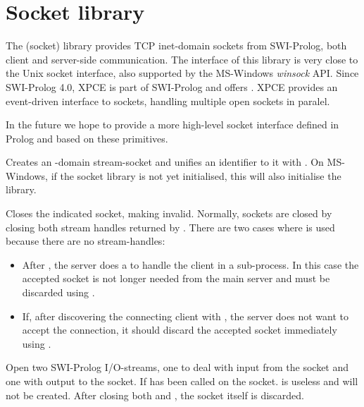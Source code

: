 \documentclass[11pt]{article}
\begin{document}
\section{Socket library}

The \pllib(socket) library provides TCP inet-domain sockets from
SWI-Prolog, both client and server-side communication. The interface of
this library is very close to the Unix socket interface, also supported
by the MS-Windows {\em winsock} API.  Since SWI-Prolog 4.0, XPCE is part
of SWI-Prolog and offers .  XPCE provides an event-driven
interface to sockets, handling multiple open sockets in paralel.

In the future we hope to provide a more high-level socket interface
defined in Prolog and based on these primitives.

\begin{description}
Creates an -domain stream-socket and unifies an identifier
to it with . On MS-Windows, if the socket library is not
yet initialised, this will also initialise the library.

Closes the indicated socket, making  invalid.  Normally,
sockets are closed by closing both stream handles returned by
.  There are two cases where  is used
because there are no stream-handles:

\begin{itemize}
    \item After , the server does a  to handle the client
	  in a sub-process. In this case the accepted socket is not
	  longer needed from the main server and must be discarded
	  using .
    \item If, after discovering the connecting client with ,
          the server does not want to accept the connection, it should
	  discard the accepted socket immediately using .
\end{itemize}

Open two SWI-Prolog I/O-streams, one to deal with input from the socket
and one with output to the socket.  If  has been called on the
socket.  is useless and will not be created. After closing
both  and , the socket itself is discarded.


\end{description}
\end{document}
